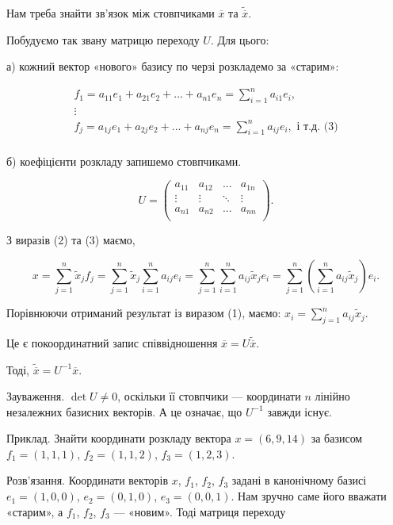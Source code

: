 Нам треба знайти зв’язок між стовпчиками $\overline{x}$ та $\tilde{\overline{x}}$.

Побудуємо так звану матрицю переходу $U$. Для цього:

а) кожний вектор «нового» базису по черзі розкладемо за «старим»: 

$$\begin{matrix}
	f_1 = a_{11} e_1 + a_{21} e_2 + ... + a_{n1} e_n = \sum\limits_{i=1}^n a_{i1} e_i, \\
	\vdots \\
	f_j = a_{1j} e_1 + a_{2j} e_2 + ... + a_{nj} e_n = \sum\limits_{i=1}^n a_{ij} e_i, \text{ і т.д. (3)} \\
\end{matrix}$$


б) коефіцієнти розкладу запишемо стовпчиками.

$$ U = \begin{pmatrix}
	a_{11} & a_{12} & ...    & a_{1n} \\
	\vdots & \vdots & \ddots & \vdots \\
	a_{n1} & a_{n2} & ...    & a_{nn} \\
\end{pmatrix}. $$

З виразів (2) та (3) маємо,

$$x = \sum\limits_{j=1}^n \tilde{x}_j f_j
= \sum\limits_{j=1}^n \tilde{x}_j \sum\limits_{i=1}^n a_{ij} e_i
= \sum\limits_{j=1}^n \sum\limits_{i=1}^n a_{ij} \tilde{x}_j e_i
= \sum\limits_{j=1}^n \left( \sum\limits_{i=1}^n a_{ij} \tilde{x}_j \right) e_i.$$

Порівнюючи отриманий результат із виразом (1), маємо: $x_i = \sum\limits_{j=1}^n a_{ij} \tilde{x}_j$.

Це є покоординатний запис співвідношення $\overline{x} = U \tilde{\overline{x}}$.

Тоді, $\tilde{\overline{x}} = U^{-1} \overline{x}$.

Зауваження. $\det U \neq 0$, оскільки її стовпчики --- координати $n$ лінійно
незалежних базисних векторів. А це означає, що $U^{-1}$ завжди існує.

Приклад. Знайти координати розкладу вектора $x = (6, 9,14)$ за базисом
$f_1 = (1,1,1)$, $f_2 = (1,1, 2)$, $f_3 = (1, 2, 3)$.

Розв’язання. Координати векторів $x$, $f_1$, $f_2$, $f_3$ задані в канонічному
базисі $e_1 = (1, 0, 0)$, $e_2 = (0,1, 0)$, $e_3 = (0, 0,1)$. Нам зручно саме його вважати
«старим», а $f_1$, $f_2$, $f_3$ --- «новим». Тоді матриця переходу

